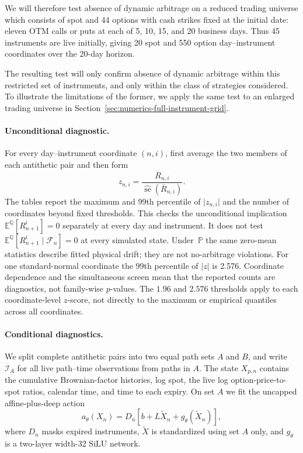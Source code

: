 \documentclass[11pt]{article}
\newcommand{\E}{\mathbb E}
\newcommand{\Q}{\mathbb Q}
\newcommand{\PP}{\mathbb P}
\newcommand{\abs}[1]{\lvert #1\rvert}
\theoremstyle{plain}
\theoremstyle{definition}
\theoremstyle{remark}
\begin{document}
We will therefore test absence of dynamic arbitrage on a reduced trading universe which consists of spot and
44 options with cash strikes fixed at the initial date: eleven OTM calls or
puts at each of 5, 10, 15, and 20 business days.  Thus 45 instruments are live
initially, giving 20 spot and 550 option day--instrument coordinates over the
20-day horizon.

The resulting test will only confirm absence of dynamic arbitrage within this restricted set of instruments, 
and only within the class of strategies considered. To illustrate the limitations of the former,
we apply the same test to an enlarged trading universe
in Section~\ref{sec:numerics-full-instrument-grid}.

\paragraph{Unconditional diagnostic.}
For every day--instrument coordinate $(n,i)$, first average the two members of
each antithetic pair and then form
\begin{equation}\label{eq:numerics-z-score}
z_{n,i}
=\frac{\overline R_{n,i}}
{\widehat{\operatorname{se}}(\overline R_{n,i})}.
\end{equation}
The tables report the maximum and 99th percentile of $\abs{z_{n,i}}$ and the
number of coordinates beyond fixed thresholds.  This checks the unconditional
implication $\E^\Q[R_{n+1}^i]=0$ separately at every day and instrument.  It
does not test $\E^\Q[R_{n+1}^i\mid\mathcal F_n]=0$ at every simulated state.
Under~$\PP$ the same zero-mean statistics describe fitted physical drift; they
are not no-arbitrage violations.  For one standard-normal coordinate the 99th
percentile of $\abs{z}$ is 2.576.  Coordinate dependence and the simultaneous
screen mean that the reported counts are diagnostics, not family-wise
$p$-values.  The $1.96$ and $2.576$ thresholds apply to each coordinate-level
$z$-score, not directly to the maximum or empirical quantiles across all
coordinates.

\paragraph{Conditional diagnostics.}
We split complete antithetic pairs into two equal path sets $A$ and $B$, and
write $\mathcal I_A$ for all live path--time observations from paths in $A$.
The state $X_{p,n}$ contains the cumulative Brownian-factor histories, log
spot, the live log option-price-to-spot ratios, calendar time, and time to each
expiry.  On set $A$ we fit the uncapped affine-plus-deep action
\begin{equation}\label{eq:numerics-action-map}
a_\theta(X_n)
=D_n\left[b+L\widetilde X_n+g_\theta(\widetilde X_n)\right],
\end{equation}
where $D_n$ masks expired instruments, $\widetilde X$ is standardized using
set $A$ only, and $g_\theta$ is a two-layer width-32 SiLU network.
\end{document}
